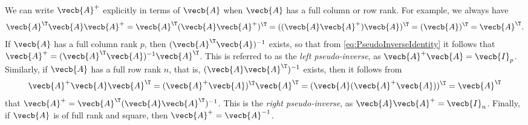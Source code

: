 We can write $\vecb{A}^+$ explicitly in terms of $\vecb{A}$ when $\vecb{A}$ has a full column or row rank. For example, we always have
\begin{equation}
	\vecb{A}^\T \vecb{A} \vecb{A}^+ = \vecb{A}^\T (\vecb{A} \vecb{A}^+)^\T = ((\vecb{A} \vecb{A}^+) \vecb{A})^\T = (\vecb{A})^\T = \vecb{A}^\T. \label{eq:PseudoInverseIdentity}
\end{equation}
If $\vecb{A}$ has a full column rank $p$, then $(\vecb{A}^\T \vecb{A})^{-1}$ exists, so that from \eqref{eq:PseudoInverseIdentity} it follows that $\vecb{A}^+ = (\vecb{A}^\T \vecb{A})^{-1} \vecb{A}^\T$. This is referred to as the \textit{left pseudo-inverse}, as $\vecb{A}^+ \vecb{A} = \vecb{I}_p$. Similarly, if $\vecb{A}$ has a full row rank $n$, that is, $(\vecb{A} \vecb{A}^\T)^{-1}$ exists, then it follows from
\begin{equation*}
	\vecb{A}^+ \vecb{A} \vecb{A}^\T = (\vecb{A}^+ \vecb{A})^\T \vecb{A}^\T = (\vecb{A} (\vecb{A}^+ \vecb{A}))^\T = \vecb{A}^\T
\end{equation*}
that $\vecb{A}^+ = \vecb{A}^\T (\vecb{A} \vecb{A}^\T)^{-1}$. This is the \textit{right pseudo-inverse}, as $\vecb{A} \vecb{A}^+ = \vecb{I}_n$. Finally, if $\vecb{A}$ is of full rank and square, then $\vecb{A}^+ = \vecb{A}^{-1}$.

